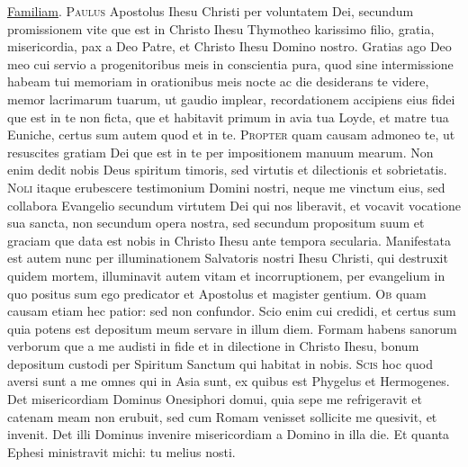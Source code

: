 \begin{multicols*}{2}
\par {} \hyperlink{familiam-tuam-dominica-quarta-post-octavas-epyphanie}{Familiam}.
\lettrine[lines=2]{\zallmancaps \color{Red} P}{aulus} Apostolus Ihesu Christi per voluntatem Dei, secundum promissionem vite que est in Christo Ihesu Thymotheo karissimo filio, gratia, misericordia, pax a Deo Patre, et Christo Ihesu Domino nostro. Gratias ago Deo meo cui servio a progenitoribus meis in conscientia pura, quod sine intermissione habeam tui memoriam in orationibus meis nocte ac die desiderans te videre, memor lacrimarum tuarum, ut gaudio implear, recordationem accipiens eius fidei que est in te non ficta, que et habitavit primum in avia tua Loyde, et matre tua Euniche, certus sum autem quod et in te.
\lettrine[lines=2]{\zallmancaps \color{Blue} P}{ropter} quam causam admoneo te, ut resuscites gratiam Dei que est in te per impositionem manuum mearum. Non enim dedit nobis Deus spiritum timoris, sed virtutis et dilectionis et sobrietatis.
\lettrine[lines=2]{\zallmancaps \color{Red} N}{oli} itaque erubescere testimonium Domini nostri, neque me vinctum eius, sed collabora Evangelio secundum virtutem Dei qui nos liberavit, et vocavit vocatione sua sancta, non secundum opera nostra, sed secundum propositum suum et graciam que data est nobis in Christo Ihesu ante tempora secularia. Manifestata est autem nunc per illuminationem Salvatoris nostri Ihesu Christi, qui destruxit quidem mortem, illuminavit autem vitam et incorruptionem, per evangelium in quo positus sum ego predicator et Apostolus et magister gentium.
\lettrine[lines=2]{\zallmancaps \color{Blue} O}{b} quam causam etiam hec patior: sed non confundor. Scio enim cui credidi, et certus sum quia potens est depositum meum servare in illum diem. Formam habens sanorum verborum que a me audisti in fide et in dilectione in Christo Ihesu, bonum depositum custodi per Spiritum Sanctum qui habitat in nobis.
\lettrine[lines=2]{\zallmancaps \color{Red} S}{cis} hoc quod aversi sunt a me omnes qui in Asia sunt, ex quibus est Phygelus et Hermogenes. Det misericordiam Dominus Onesiphori domui, quia sepe me refrigeravit et catenam meam non erubuit, sed cum Romam venisset sollicite me quesivit, et invenit. Det illi Dominus invenire misericordiam a Domino in illa die. Et quanta Ephesi ministravit michi: tu melius nosti.

\end{multicols*}
